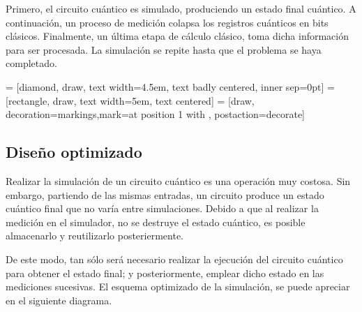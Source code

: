 Primero, el circuito cuántico es simulado, produciendo un estado final cuántico.  
A continuación, un proceso de medición colapsa los registros cuánticos en bits 
clásicos. Finalmente, un última etapa de cálculo clásico, toma dicha información 
para ser procesada. La simulación se repite hasta que el problema se haya 
completado.
%
\begin{center}
 = [diamond, draw, text width=4.5em, text badly centered, 
inner sep=0pt]
 = [rectangle, draw, text width=5em, text centered]
 = [draw, decoration={markings,mark=at position 
1 with {}}, postaction={decorate}]
%
\end{center}
%

\subsection{Diseño optimizado}
Realizar la simulación de un circuito cuántico es una operación muy costosa. Sin 
embargo, partiendo de las mismas entradas, un circuito produce un estado 
cuántico final que no varía entre simulaciones. Debido a que al realizar la 
medición en el simulador, no se destruye el estado cuántico, es posible 
almacenarlo y reutilizarlo posteriermente.

De este modo, tan sólo será necesario realizar la ejecución del circuito 
cuántico para obtener el estado final; y posteriormente, emplear dicho estado en 
las mediciones sucesivas. El esquema optimizado de la simulación, se puede 
apreciar en el siguiente diagrama.

